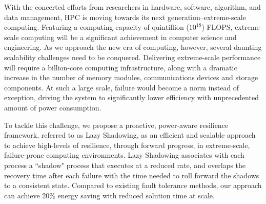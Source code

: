 With the concerted efforts from researchers in hardware, software, algorithm, and data management, HPC is moving towards its next generation--extreme-scale computing. Featuring a computing capacity of  quintillion ($10^{18}$) FLOPS, extreme-scale computing will be a significant achievement in computer science and engineering. %
As we approach the new era of computing, however, several daunting scalability challenges need to be conquered. Delivering extreme-scale performance will require a billion-core computing infrastructure, along with a dramatic increase in the number of memory modules, communications devices and storage components. At such a large scale, failure would become a norm instead of exception, driving the system to significantly lower efficiency with unprecedented amount of power consumption. %

To tackle this challenge, we propose a proactive, power-aware resilience framework, referred to as Lazy Shadowing, as an efficient and scalable approach to achieve high-levels of resilience, through forward progress, in extreme-scale, failure-prone computing environments. 
Lazy Shadowing associates with each process a ``shadow" process that executes at a reduced rate, and overlaps the recovery time after each failure with the time needed to roll forward the shadows to a consistent state.
Compared to existing fault tolerance methods, our approach can achieve 20\% energy saving with reduced solution time at scale.
